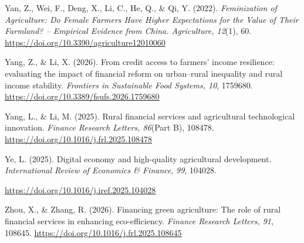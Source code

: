 ﻿\documentclass[sn-mathphys-num]{sn-jnl}
\newcommand{\hl}[1]{#1}
\begin{document}
\hl{Yan, Z., Wei, F., Deng, X., Li, C., He, Q., \& Qi, Y. (2022).
\emph{Feminization of Agriculture: Do Female Farmers Have Higher
Expectations for the Value of Their Farmland? -- Empirical Evidence from
China. Agriculture, 12}(1), 60.}
\href{https://doi.org/10.3390/agriculture12010060}{\hl{https://doi.org/10.3390/agriculture12010060}}

\hl{Yang, Z., \& Li, X. (2026). From credit access to farmers' income
resilience: evaluating the impact of financial reform on urban--rural
inequality and rural income stability. \emph{Frontiers in Sustainable
Food Systems, 10}, 1759680.}
\href{https://doi.org/10.3389/fsufs.2026.1759680}{\hl{https://doi.org/10.3389/fsufs.2026.1759680}}

\hl{Yang, L., \& Li, M. (2025). Rural financial services and
agricultural technological innovation. \emph{Finance Research Letters,
86}(Part B), 108478.}
\href{https://doi.org/10.1016/j.frl.2025.108478}{\hl{https://doi.org/10.1016/j.frl.2025.108478}}

\hl{Ye, L. (2025). Digital economy and high-quality agricultural
development. \emph{International Review of Economics \& Finance},
\emph{99}, 104028.}

\href{https://doi.org/10.1016/j.iref.2025.104028}{\hl{https://doi.org/10.1016/j.iref.2025.104028}}

\hl{Zhou, X., \& Zhang, R. (2026). Financing green agriculture: The role
of rural financial services in enhancing eco-efficiency. \emph{Finance
Research Letters, 91}, 108645.}
\href{https://doi.org/10.1016/j.frl.2025.108645}{\hl{https://doi.org/10.1016/j.frl.2025.108645}}

\endgroup
\end{document}
